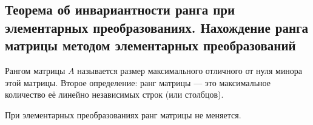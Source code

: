 \subsection{Теорема об инвариантности ранга при элементарных преобразованиях. Нахождение ранга матрицы методом элементарных преобразований}

\begin{definition}
Рангом матрицы $A$ называется размер максимального отличного от нуля минора этой матрицы. Второе определение: ранг матрицы — это максимальное количество её линейно независимых строк (или столбцов).
\end{definition}

\begin{theorem}
При элементарных преобразованиях ранг матрицы не меняется.
\end{theorem}

